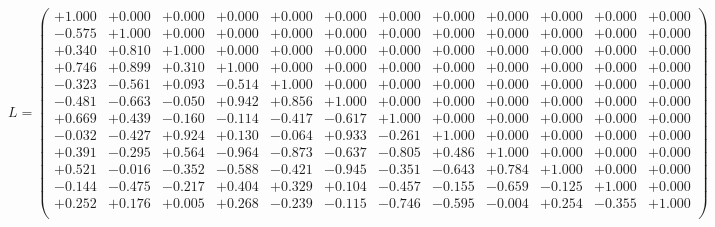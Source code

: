 \documentclass[9pt]{article}
\theoremstyle{plain}
\theoremstyle{definition}
\theoremstyle{remark}
\numberwithin{equation}{section}
\begin{document}
$L = \left(
\begin{array}{
cccccccccccc}
+1.000 & +0.000 & +0.000 & +0.000 & +0.000 & +0.000 & +0.000 & +0.000 & +0.000 & +0.000 & +0.000 & +0.000 \\
-0.575 & +1.000 & +0.000 & +0.000 & +0.000 & +0.000 & +0.000 & +0.000 & +0.000 & +0.000 & +0.000 & +0.000 \\
+0.340 & +0.810 & +1.000 & +0.000 & +0.000 & +0.000 & +0.000 & +0.000 & +0.000 & +0.000 & +0.000 & +0.000 \\
+0.746 & +0.899 & +0.310 & +1.000 & +0.000 & +0.000 & +0.000 & +0.000 & +0.000 & +0.000 & +0.000 & +0.000 \\
-0.323 & -0.561 & +0.093 & -0.514 & +1.000 & +0.000 & +0.000 & +0.000 & +0.000 & +0.000 & +0.000 & +0.000 \\
-0.481 & -0.663 & -0.050 & +0.942 & +0.856 & +1.000 & +0.000 & +0.000 & +0.000 & +0.000 & +0.000 & +0.000 \\
+0.669 & +0.439 & -0.160 & -0.114 & -0.417 & -0.617 & +1.000 & +0.000 & +0.000 & +0.000 & +0.000 & +0.000 \\
-0.032 & -0.427 & +0.924 & +0.130 & -0.064 & +0.933 & -0.261 & +1.000 & +0.000 & +0.000 & +0.000 & +0.000 \\
+0.391 & -0.295 & +0.564 & -0.964 & -0.873 & -0.637 & -0.805 & +0.486 & +1.000 & +0.000 & +0.000 & +0.000 \\
+0.521 & -0.016 & -0.352 & -0.588 & -0.421 & -0.945 & -0.351 & -0.643 & +0.784 & +1.000 & +0.000 & +0.000 \\
-0.144 & -0.475 & -0.217 & +0.404 & +0.329 & +0.104 & -0.457 & -0.155 & -0.659 & -0.125 & +1.000 & +0.000 \\
+0.252 & +0.176 & +0.005 & +0.268 & -0.239 & -0.115 & -0.746 & -0.595 & -0.004 & +0.254 & -0.355 & +1.000 \\
\end{array}
\right)$ \newline 
\end{document}
